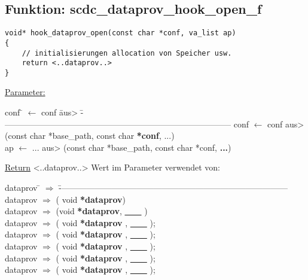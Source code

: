 

\subsection{\textbf{Funktion:} scdc\_dataprov\_hook\_open\_f}\label{scdc_dataprov_hook_open_f}
\begin{lstlisting}[escapechar={~}]
void* hook_dataprov_open(const char *conf, va_list ap)
{
	// initialisierungen allocation von Speicher usw.
	return <..dataprov..>
}
\end{lstlisting}

\underline{Parameter:}
\begin{tabbing}
conf \= $\leftarrow$ conf \= aus> \= ---------------------------------------------------------------------------------- \kill
conf \> $\leftarrow$ conf \> aus> \> (const char *base\_path, const char \textbf{*conf}, ...)\\
ap   \> $\leftarrow$ ...  \> aus> \> (const char *base\_path, const char *conf, \textbf{...})\\
\end{tabbing}
\underline{Return} <..dataprov..> Wert im Parameter verwendet von:
\begin{tabbing}
dataprov \= $\Rightarrow$ \= ---------------------------------------------------------------------------------- \kill
dataprov \> $\Rightarrow$ \> ( void \textbf{*dataprov})\\
dataprov \> $\Rightarrow$ \> (void \textbf{*dataprov}, \underline{~~~~} )\\
dataprov \> $\Rightarrow$ \> ( void \textbf{*dataprov} , \underline{~~~~} );\\
dataprov \> $\Rightarrow$ \> ( void \textbf{*dataprov} , \underline{~~~~} );\\
dataprov \> $\Rightarrow$ \> ( void \textbf{*dataprov} , \underline{~~~~} );\\
dataprov \> $\Rightarrow$ \> ( void \textbf{*dataprov} , \underline{~~~~} );\\
dataprov \> $\Rightarrow$ \> ( void \textbf{*dataprov} , \underline{~~~~} );\\
\end{tabbing}


